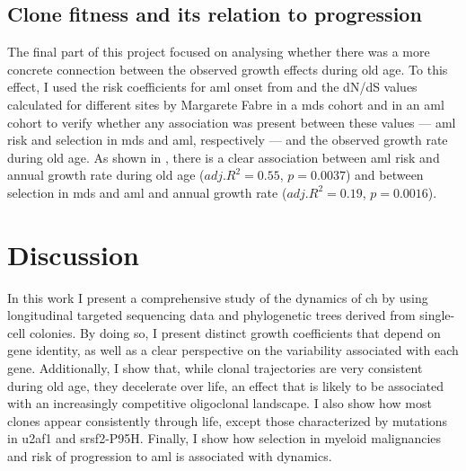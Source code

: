 \subsection{Clone fitness and its relation to progression}

The final part of this project focused on analysing whether there was a more concrete connection between the observed growth effects during old age. To this effect, I used the risk coefficients for \ac{aml} onset from \cite{Abelson2018-wh} and the dN/dS values calculated for different sites by Margarete Fabre in a \ac{mds} cohort and in an \ac{aml} cohort to verify whether any association was present between these values --- \ac{aml} risk and selection in \ac{mds} and \ac{aml}, respectively --- and the observed growth rate during old age. As shown in , there is a clear association between \ac{aml} risk and annual growth rate during old age ($adj. R^2=0.55$, $p=0.0037$) and between selection in \ac{mds} and \ac{aml} and annual growth rate ($adj. R^2=0.19$, $p=0.0016$).

\begin{figure}[!ht]
	\label{fig:ch-risk-selection}
\end{figure}

\FloatBarrier

\section{Discussion}

In this work I present a comprehensive study of the dynamics of \ac{ch} by using longitudinal targeted sequencing data and phylogenetic trees derived from single-cell colonies. By doing so, I present distinct growth coefficients that depend on gene identity, as well as a clear perspective on the variability associated with each gene. Additionally, I show that, while clonal trajectories are very consistent during old age, they decelerate over life, an effect that is likely to be associated with an increasingly competitive oligoclonal landscape. I also show how most clones appear consistently through life, except those characterized by mutations in \ac{u2af1} and \ac{srsf2}-P95H. Finally, I show how selection in myeloid malignancies and risk of progression to \ac{aml} is associated with dynamics.

